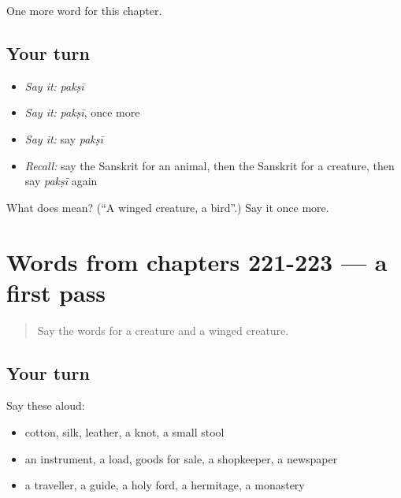\begin{grammarlens}[title={What you've built}]
One more word for this chapter.
\end{grammarlens}

\subsection*{Your turn}
\begin{itemize}
\raggedright
  \item \emph{Say it:} \emph{pakṣī}
  \item \emph{Say it:} \emph{pakṣī}, once more
  \item \emph{Say it:} say \emph{pakṣī}
  \item \emph{Recall:} say the Sanskrit for an animal, then the Sanskrit for a creature, then say \emph{pakṣī} again
\end{itemize}

\begin{tcolorbox}[breakable,colback=teal!4,colframe=teal!35!black,title={Before you move on}]
What does  mean? (\textquotedblleft{}A winged creature, a bird\textquotedblright{}.) Say it once more.
\end{tcolorbox}
\section[(dialogue)]{Words from chapters 221-223 — a first pass}

\label{lesson:SA-R226-first-pass-words-from-chapters-221-223}



\begin{quote}
Say the words for a creature and a winged creature.
\end{quote}

\subsection*{Your turn}
Say these aloud:

\begin{itemize}
\raggedright
  \item cotton, silk, leather, a knot, a small stool
  \item an instrument, a load, goods for sale, a shopkeeper, a newspaper
  \item a traveller, a guide, a holy ford, a hermitage, a monastery
\end{itemize}

